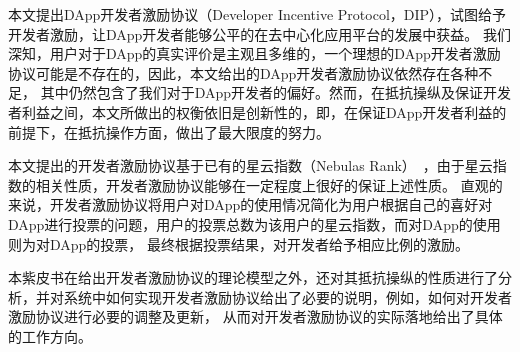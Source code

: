 本文提出DApp开发者激励协议（Developer Incentive Protocol，DIP），试图给予开发者激励，让DApp开发者能够公平的在去中心化应用平台的发展中获益。
我们深知，用户对于DApp的真实评价是主观且多维的，一个理想的DApp开发者激励协议可能是不存在的，因此，本文给出的DApp开发者激励协议依然存在各种不足，
其中仍然包含了我们对于DApp开发者的偏好。然而，在抵抗操纵及保证开发者利益之间，本文所做出的权衡依旧是创新性的，即，在保证DApp开发者利益的前提下，在抵抗操作方面，做出了最大限度的努力。

本文提出的开发者激励协议基于已有的星云指数（Nebulas Rank）~\cite{Nabulasyellowpaper}，由于星云指数的相关性质，开发者激励协议能够在一定程度上很好的保证上述性质。
直观的来说，开发者激励协议将用户对DApp的使用情况简化为用户根据自己的喜好对DApp进行投票的问题，用户的投票总数为该用户的星云指数，而对DApp的使用则为对DApp的投票，
最终根据投票结果，对开发者给予相应比例的激励。

本紫皮书在给出开发者激励协议的理论模型之外，还对其抵抗操纵的性质进行了分析，并对系统中如何实现开发者激励协议给出了必要的说明，例如，如何对开发者激励协议进行必要的调整及更新，
从而对开发者激励协议的实际落地给出了具体的工作方向。


